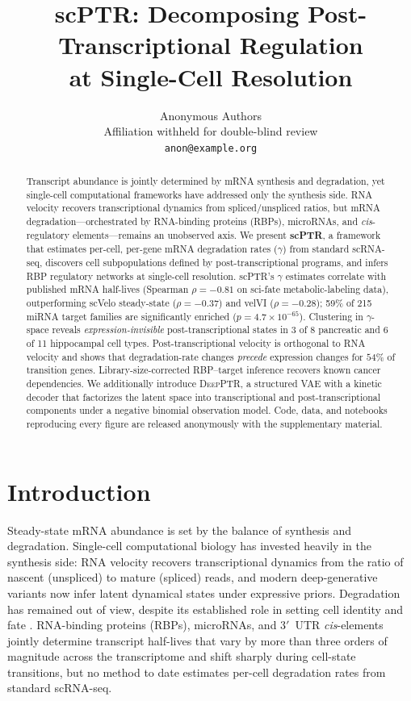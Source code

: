 \documentclass{article}
\title{scPTR: Decomposing Post-Transcriptional Regulation \\ at Single-Cell Resolution}
\author{%
  Anonymous Authors\\
  Affiliation withheld for double-blind review\\
  \texttt{anon@example.org}
}
\begin{document}
\maketitle

\begin{abstract}
Transcript abundance is jointly determined by mRNA synthesis and degradation, yet
single-cell computational frameworks have addressed only the synthesis side. RNA
velocity recovers transcriptional dynamics from spliced/unspliced ratios, but
mRNA degradation---orchestrated by RNA-binding proteins (RBPs), microRNAs, and
\textit{cis}-regulatory elements---remains an unobserved axis. We present
\textbf{scPTR}, a framework that estimates per-cell, per-gene mRNA degradation
rates ($\gamma$) from standard scRNA-seq, discovers cell subpopulations defined by
post-transcriptional programs, and infers RBP regulatory networks at single-cell
resolution. scPTR's $\gamma$ estimates correlate with published mRNA
half-lives (Spearman $\rho{=}{-}0.81$ on sci-fate metabolic-labeling data),
outperforming scVelo steady-state ($\rho{=}{-}0.37$) and velVI
($\rho{=}{-}0.28$); 59\% of 215 miRNA target families are significantly enriched
($p{=}4.7{\times}10^{-65}$). Clustering in $\gamma$-space reveals
\emph{expression-invisible} post-transcriptional states in 3 of 8 pancreatic
and 6 of 11 hippocampal cell types. Post-transcriptional velocity is orthogonal
to RNA velocity and shows that degradation-rate changes \emph{precede}
expression changes for $54\%$ of transition genes. Library-size-corrected
RBP--target inference recovers known cancer dependencies. We additionally
introduce \textsc{DeepPTR}, a structured VAE with a kinetic decoder that
factorizes the latent space into transcriptional and post-transcriptional
components under a negative binomial observation model. Code, data, and
notebooks reproducing every figure are released anonymously with the
supplementary material.
\end{abstract}

\section{Introduction}
\label{sec:intro}

Steady-state mRNA abundance is set by the balance of synthesis and degradation.
Single-cell computational biology has invested heavily in the synthesis side:
RNA velocity \citep{lamanno2018,bergen2020} recovers transcriptional dynamics
from the ratio of nascent (unspliced) to mature (spliced) reads, and modern
deep-generative variants \citep{velvi,unitvelo} now infer latent dynamical
states under expressive priors. Degradation has remained out of view, despite
its established role in setting cell identity and fate \citep{hentze2018}.
RNA-binding proteins (RBPs), microRNAs, and 3$'$~UTR \textit{cis}-elements
jointly determine transcript half-lives that vary by more than three orders of
magnitude across the transcriptome and shift sharply during cell-state
transitions, but no method to date estimates per-cell degradation rates from
standard scRNA-seq.
\end{document}
